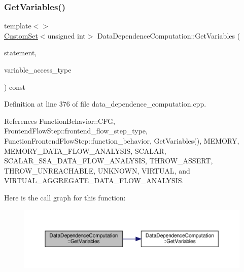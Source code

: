 \subsubsection{\texorpdfstring{Get\+Variables()}{GetVariables()}\hspace{0.1cm}{\footnotesize\ttfamily [2/2]}}
{\footnotesize\ttfamily template$<$$>$ \\
\hyperlink{custom__set_8hpp_a615bc2f42fc38a4bb1790d12c759e86f}{Custom\+Set}$<$unsigned int$>$ Data\+Dependence\+Computation\+::\+Get\+Variables (\begin{DoxyParamCaption}\item[{const \hyperlink{graph_8hpp_abefdcf0544e601805af44eca032cca14}{vertex}}]{statement,  }\item[{const \hyperlink{function__behavior_8hpp_a68c28bfcfefbe63cece191e941af0409}{Function\+Behavior\+\_\+\+Variable\+Access\+Type}}]{variable\+\_\+access\+\_\+type }\end{DoxyParamCaption}) const}



Definition at line 376 of file data\+\_\+dependence\+\_\+computation.\+cpp.



References Function\+Behavior\+::\+C\+FG, Frontend\+Flow\+Step\+::frontend\+\_\+flow\+\_\+step\+\_\+type, Function\+Frontend\+Flow\+Step\+::function\+\_\+behavior, Get\+Variables(), M\+E\+M\+O\+RY, M\+E\+M\+O\+R\+Y\+\_\+\+D\+A\+T\+A\+\_\+\+F\+L\+O\+W\+\_\+\+A\+N\+A\+L\+Y\+S\+IS, S\+C\+A\+L\+AR, S\+C\+A\+L\+A\+R\+\_\+\+S\+S\+A\+\_\+\+D\+A\+T\+A\+\_\+\+F\+L\+O\+W\+\_\+\+A\+N\+A\+L\+Y\+S\+IS, T\+H\+R\+O\+W\+\_\+\+A\+S\+S\+E\+RT, T\+H\+R\+O\+W\+\_\+\+U\+N\+R\+E\+A\+C\+H\+A\+B\+LE, U\+N\+K\+N\+O\+WN, V\+I\+R\+T\+U\+AL, and V\+I\+R\+T\+U\+A\+L\+\_\+\+A\+G\+G\+R\+E\+G\+A\+T\+E\+\_\+\+D\+A\+T\+A\+\_\+\+F\+L\+O\+W\+\_\+\+A\+N\+A\+L\+Y\+S\+IS.

Here is the call graph for this function\+:
\nopagebreak
\begin{figure}[H]
\begin{center}
\leavevmode
\includegraphics[width=350pt]{d3/dc0/classDataDependenceComputation_a3c07664d77f1db17cd033b086900bba0_cgraph}
\end{center}
\end{figure}
\mbox{\label{classDataDependenceComputation_adeeabf6602796c390b4e331e553c71b9}} 
